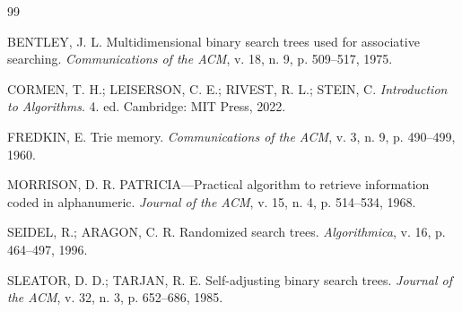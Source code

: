 \documentclass[11pt,a4paper]{article}
\begin{document}
\vspace{-0.10cm}
\begin{thebibliography}{99}
\footnotesize
\setlength{\itemsep}{-1.5pt}
\setlength{\parskip}{0pt}

BENTLEY, J. L. Multidimensional binary search trees used for associative searching.
\textit{Communications of the ACM}, v. 18, n. 9, p. 509--517, 1975.

CORMEN, T. H.; LEISERSON, C. E.; RIVEST, R. L.; STEIN, C.
\textit{Introduction to Algorithms}. 4. ed. Cambridge: MIT Press, 2022.

FREDKIN, E. Trie memory. \textit{Communications of the ACM}, v. 3, n. 9,
p. 490--499, 1960.

MORRISON, D. R. PATRICIA---Practical algorithm to retrieve information coded in
alphanumeric. \textit{Journal of the ACM}, v. 15, n. 4, p. 514--534, 1968.

SEIDEL, R.; ARAGON, C. R. Randomized search trees.
\textit{Algorithmica}, v. 16, p. 464--497, 1996.

SLEATOR, D. D.; TARJAN, R. E. Self-adjusting binary search trees.
\textit{Journal of the ACM}, v. 32, n. 3, p. 652--686, 1985.

\end{thebibliography}
\end{document}
